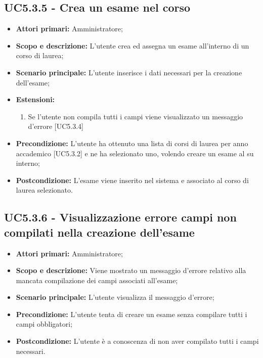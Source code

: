 \documentclass[AnalisiDeiRequisiti.tex]{subfiles}
\begin{document}
\subsection{UC5.3.5 - Crea un esame nel corso}
\begin{itemize}
	\item \textbf{Attori primari:} Amministratore;
	\item \textbf{Scopo e descrizione:} L'utente crea ed assegna un esame all'interno di un corso di laurea;
	\item \textbf{Scenario principale:} L'utente inserisce i dati necessari per la creazione dell'esame;
	\item \textbf{Estensioni:}
	\begin{enumerate}
		\item Se l'utente non compila tutti i campi viene visualizzato un messaggio d'errore [UC5.3.4]
	\end{enumerate}
	\item \textbf{Precondizione:} L'utente ha ottenuto una lista di corsi di laurea per anno accademico [UC5.3.2] e ne ha selezionato uno, volendo creare un esame al su interno; 
	\item \textbf{Postcondizione:} L'esame viene inserito nel sistema e associato al corso di laurea selezionato.
\end{itemize}
\subsection{UC5.3.6 - Visualizzazione errore campi non compilati nella creazione dell'esame}
\begin{itemize}
	\item \textbf{Attori primari:} Amministratore;
	\item \textbf{Scopo e descrizione:} Viene mostrato un messaggio d'errore relativo alla mancata compilazione dei campi associati all'esame;
	\item \textbf{Scenario principale:} L'utente visualizza il messaggio d'errore;
	\item \textbf{Precondizione:} L'utente tenta di creare un esame senza compilare tutti i campi obbligatori; 
	\item \textbf{Postcondizione:} L'utente è a conoscenza di non aver compilato tutti i campi necessari.
\end{itemize}
\end{document}
